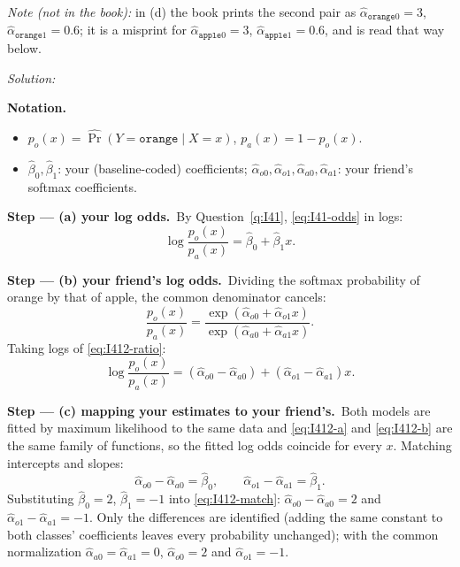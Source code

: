 \documentclass[11pt,a4paper]{article}
\newif\ifsolucoes
\newcommand{\espacoresol}{3.5cm}   %
\numberwithin{equation}{questao}   %
\newenvironment{notacao}{\par\smallskip\noindent\textbf{Notation.}\begin{itemize}[leftmargin=1.4em,topsep=1pt,itemsep=0pt]\small}{\end{itemize}}
\newcommand{\resolespaco}{\ifsolucoes\else\par\textit{Solution:}\vspace{\espacoresol}\par\fi}
\newcommand{\passo}[2]{\par\smallskip\noindent\textbf{Step --- #1.}~#2}
\begin{document}
{\small\textit{Note (not in the book):} in (d) the book prints the second pair as
$\hat\alpha_{\texttt{orange}0}=3$, $\hat\alpha_{\texttt{orange}1}=0.6$; it is a misprint for
$\hat\alpha_{\texttt{apple}0}=3$, $\hat\alpha_{\texttt{apple}1}=0.6$, and is read that way below.\par}
\resolespaco
\begin{sol}
\begin{notacao}
\item $p_o(x)=\widehat\Pr(Y=\texttt{orange}\mid X=x)$, $p_a(x)=1-p_o(x)$.
\item $\hat\beta_0,\hat\beta_1$: your (baseline-coded) coefficients; $\hat\alpha_{o0},\hat\alpha_{o1},\hat\alpha_{a0},\hat\alpha_{a1}$: your friend's softmax coefficients.
\end{notacao}

\passo{(a) your log odds}{By Question~\ref{q:I41}, \eqref{eq:I41-odds} in logs:
\begin{equation}\label{eq:I412-a}
\log\frac{p_o(x)}{p_a(x)}=\hat\beta_0+\hat\beta_1x .
\end{equation}}

\passo{(b) your friend's log odds}{Dividing the softmax probability of orange by that of apple, the common denominator cancels:
\begin{equation}\label{eq:I412-ratio}
\frac{p_o(x)}{p_a(x)}=\frac{\exp(\hat\alpha_{o0}+\hat\alpha_{o1}x)}{\exp(\hat\alpha_{a0}+\hat\alpha_{a1}x)} .
\end{equation}
Taking logs of \eqref{eq:I412-ratio}:
\begin{equation}\label{eq:I412-b}
\log\frac{p_o(x)}{p_a(x)}=(\hat\alpha_{o0}-\hat\alpha_{a0})+(\hat\alpha_{o1}-\hat\alpha_{a1})x .
\end{equation}}

\passo{(c) mapping your estimates to your friend's}{Both models are fitted by maximum likelihood
to the same data and \eqref{eq:I412-a} and \eqref{eq:I412-b} are the same family of functions, so
the fitted log odds coincide for every $x$. Matching intercepts and slopes:
\begin{equation}\label{eq:I412-match}
\hat\alpha_{o0}-\hat\alpha_{a0}=\hat\beta_0,\qquad \hat\alpha_{o1}-\hat\alpha_{a1}=\hat\beta_1 .
\end{equation}
Substituting $\hat\beta_0=2$, $\hat\beta_1=-1$ into \eqref{eq:I412-match}: $\hat\alpha_{o0}-\hat\alpha_{a0}=2$
and $\hat\alpha_{o1}-\hat\alpha_{a1}=-1$. Only the differences are identified (adding the same
constant to both classes' coefficients leaves every probability unchanged); with the common
normalization $\hat\alpha_{a0}=\hat\alpha_{a1}=0$, $\hat\alpha_{o0}=2$ and $\hat\alpha_{o1}=-1$.}


\end{sol}
\end{document}

